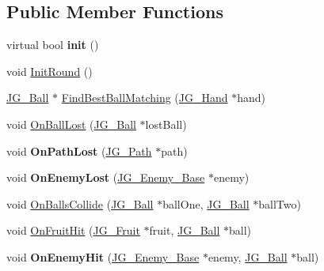 \subsection*{Public Member Functions}
\begin{DoxyCompactItemize}
\item 
\hypertarget{class_j_g___game___main_a4d1e63d731fabbe9e57383254a4b21bf}{virtual bool {\bfseries init} ()}\label{class_j_g___game___main_a4d1e63d731fabbe9e57383254a4b21bf}

\item 
void \hyperlink{class_j_g___game___main_a14c87e281755122878c191ffdb902db4}{Init\-Round} ()
\item 
\hyperlink{class_j_g___ball}{J\-G\-\_\-\-Ball} $\ast$ \hyperlink{class_j_g___game___main_a50f256169fed2e1ff3ebc56b6568db56}{Find\-Best\-Ball\-Matching} (\hyperlink{class_j_g___hand}{J\-G\-\_\-\-Hand} $\ast$hand)
\item 
void \hyperlink{class_j_g___game___main_afa13ae21a568e417e32653ec985ff21a}{On\-Ball\-Lost} (\hyperlink{class_j_g___ball}{J\-G\-\_\-\-Ball} $\ast$lost\-Ball)
\item 
\hypertarget{class_j_g___game___main_aa6ee140f26cee89e5c640869287e0b4c}{void {\bfseries On\-Path\-Lost} (\hyperlink{class_j_g___path}{J\-G\-\_\-\-Path} $\ast$path)}\label{class_j_g___game___main_aa6ee140f26cee89e5c640869287e0b4c}

\item 
\hypertarget{class_j_g___game___main_a9de0b199bc254378821c96158041337c}{void {\bfseries On\-Enemy\-Lost} (\hyperlink{class_j_g___enemy___base}{J\-G\-\_\-\-Enemy\-\_\-\-Base} $\ast$enemy)}\label{class_j_g___game___main_a9de0b199bc254378821c96158041337c}

\item 
void \hyperlink{class_j_g___game___main_a9fb58ac20271c53d749c5619e5cdf2fd}{On\-Balls\-Collide} (\hyperlink{class_j_g___ball}{J\-G\-\_\-\-Ball} $\ast$ball\-One, \hyperlink{class_j_g___ball}{J\-G\-\_\-\-Ball} $\ast$ball\-Two)
\item 
void \hyperlink{class_j_g___game___main_af395f20fd9dfc307cfb2d3234cb2b301}{On\-Fruit\-Hit} (\hyperlink{class_j_g___fruit}{J\-G\-\_\-\-Fruit} $\ast$fruit, \hyperlink{class_j_g___ball}{J\-G\-\_\-\-Ball} $\ast$ball)
\item 
\hypertarget{class_j_g___game___main_a4d785e14155d7d0efe13156d6223a0b9}{void {\bfseries On\-Enemy\-Hit} (\hyperlink{class_j_g___enemy___base}{J\-G\-\_\-\-Enemy\-\_\-\-Base} $\ast$enemy, \hyperlink{class_j_g___ball}{J\-G\-\_\-\-Ball} $\ast$ball)}\label{class_j_g___game___main_a4d785e14155d7d0efe13156d6223a0b9}


\end{DoxyCompactItemize}
